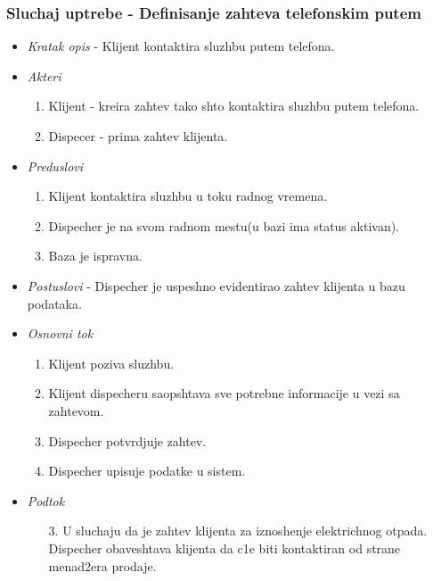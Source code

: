 \documentclass[10 pt]{article}
\begin{document}
	\subsubsection{Sluchaj uptrebe - Definisanje zahteva telefonskim putem}
	
		\begin{itemize}
			
			\item\textit{Kratak opis} - Klijent kontaktira sluzhbu putem telefona.

			
			\item\textit{Akteri} 
				\begin{enumerate}
					\item Klijent - kreira zahtev tako shto kontaktira sluzhbu putem telefona.
					\item Dispecer - prima zahtev klijenta.
				\end{enumerate}

			
			\item\textit{Preduslovi} 
				\begin{enumerate}
					\item Klijent kontaktira sluzhbu u toku  radnog vremena.
					\item Dispecher je na svom radnom mestu(u bazi ima status aktivan).

					\item Baza je ispravna.

				\end{enumerate}
			
			\item\textit{Postuslovi} - Dispecher je uspeshno evidentirao zahtev klijenta u bazu podataka.

			
			\item\textit{Osnovni tok}

				\begin{enumerate}
					\item Klijent poziva sluzhbu.

					\item Klijent dispecheru saopshtava sve potrebne informacije u vezi sa zahtevom.

					\item Dispecher potvrdjuje zahtev.

					\item Dispecher upisuje podatke u sistem.

				\end{enumerate}
			
			\item\textit{Podtok}
				\begin{enumerate}
					\item [3.] U sluchaju da je zahtev klijenta za iznoshenje elektrichnog otpada. Dispecher obaveshtava klijenta da c1e biti kontaktiran od strane menad2era prodaje.
				\end{enumerate}
			

\end{itemize}
\end{document}
